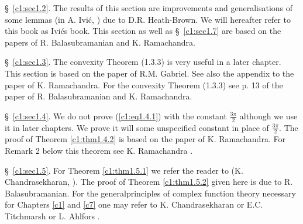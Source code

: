 \S\ \ref{c1:sec1.2}. The results of this section are improvements and generalisations of some lemmas (in A. Ivi\'c, \cite{Ivic1}) due to D.R. Heath-Brown. We will hereafter refer to this book as Ivi\'cs book. This section as well as \S\ \ref{c1:sec1.7} are based on the papers \cite{Balasubramanian and Ramachandra2} \cite{Balasubramanian and Ramachandra3} of R. Balasubramanian and K. Ramachandra.


\S\ \ref{c1:sec1.3}. The convexity Theorem (1.3.3) is very useful in a later chapter. This section is based on the paper \cite{Gabriel1} of R.M. Gabriel. See also the appendix to the paper \cite{Ramachandra3} of K. Ramachandra. For the convexity Theorem (1.3.3) see p. 13 of the paper \cite{Balasubramanian and Ramachandra4} of R. Balasubramanian and K. Ramachandra. 


\S\ \ref{c1:sec1.4}. We do not prove (\ref{c1:eq1.4.1}) with the constant $\frac{3\pi}{2}$ although we use it in later chapters. We prove it will some unspecified constant in place of $\frac{3\pi}{2}$. The proof of Theorem \ref{c1:thm1.4.2} is based on the paper \cite{Ramachandra4} of K. Ramachandra. For Remark 2 below this theorem see K. Ramachandra \cite{Ramachandra5}.

\S\ \ref{c1:sec1.5}. For Theorem \ref{c1:thm1.5.1} we refer the reader to (K. Chandrasekharan, \cite{Chandrasekharan1}). The proof of Theorem \ref{c1:thm1.5.2} given here is due to R. Balasubramanian. For the general\pageoriginale  principles of complex function theory necessary for Chapters \ref{c1} and \ref{c7} one may refer to K. Chandrasekharan \cite{Chandrasekharan1} or E.C. Titchmarsh \cite{Titchmarsh2} or L. Ahlfors \cite{Ahlfors1}.

